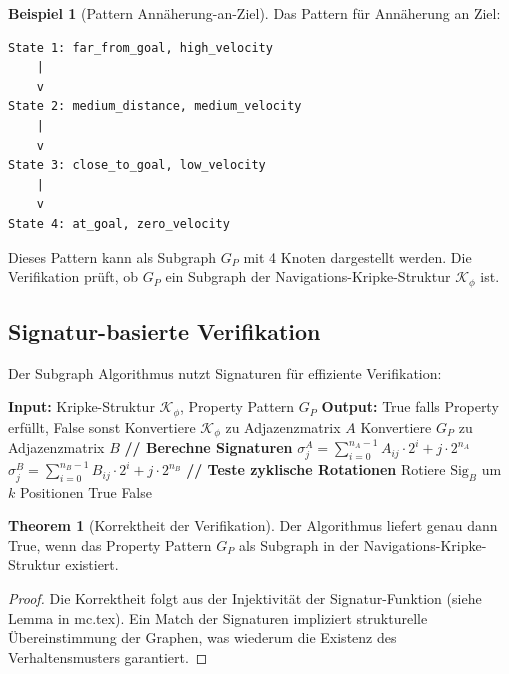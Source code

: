 ﻿\documentclass[a4paper,12pt]{article}
\theoremstyle{definition}
\newtheorem{beispiel}{Beispiel}[section]
\newtheorem{theorem}{Theorem}[section]
\begin{document}
\begin{beispiel}[Pattern Annäherung-an-Ziel] Das Pattern für Annäherung an Ziel:
\begin{verbatim}
State 1: far_from_goal, high_velocity
    |
    v
State 2: medium_distance, medium_velocity
    |
    v
State 3: close_to_goal, low_velocity
    |
    v
State 4: at_goal, zero_velocity
\end{verbatim}

Dieses Pattern kann als Subgraph $G_P$ mit 4 Knoten dargestellt werden. Die Verifikation prüft, ob $G_P$ ein Subgraph der Navigations-Kripke-Struktur $\mathcal{K}_{\phi}$ ist.
\end{beispiel}

\subsection{Signatur-basierte Verifikation}

Der Subgraph Algorithmus nutzt Signaturen für effiziente Verifikation:

\begin{algorithm}
\caption{Verify Navigation Property}
\begin{algorithmic}[1]
\State \textbf{Input:} Kripke-Struktur $\mathcal{K}_{\phi}$, Property Pattern $G_P$
\State \textbf{Output:} True falls Property erfüllt, False sonst
\State 
\State Konvertiere $\mathcal{K}_{\phi}$ zu Adjazenzmatrix $A$
\State Konvertiere $G_P$ zu Adjazenzmatrix $B$
\State 
\State \textbf{// Berechne Signaturen}
    \State $\sigma_j^A = \sum_{i=0}^{n_A-1} A_{ij} \cdot 2^i + j \cdot 2^{n_A}$
\EndFor
{}
    \State $\sigma_j^B = \sum_{i=0}^{n_B-1} B_{ij} \cdot 2^i + j \cdot 2^{n_B}$
\EndFor
\State 
\State \textbf{// Teste zyklische Rotationen}
    \State Rotiere $\text{Sig}_B$ um $k$ Positionen
        \State \Return True
    \EndIf
\EndFor
\State \Return False
\end{algorithmic}
\end{algorithm}

\begin{theorem}[Korrektheit der Verifikation]
Der Algorithmus liefert genau dann True, wenn das Property Pattern $G_P$ als Subgraph in der Navigations-Kripke-Struktur existiert.
\end{theorem}

\begin{proof}
Die Korrektheit folgt aus der Injektivität der Signatur-Funktion (siehe Lemma in mc.tex). Ein Match der Signaturen impliziert strukturelle Übereinstimmung der Graphen, was wiederum die Existenz des Verhaltensmusters garantiert.
\end{proof}
\end{document}
